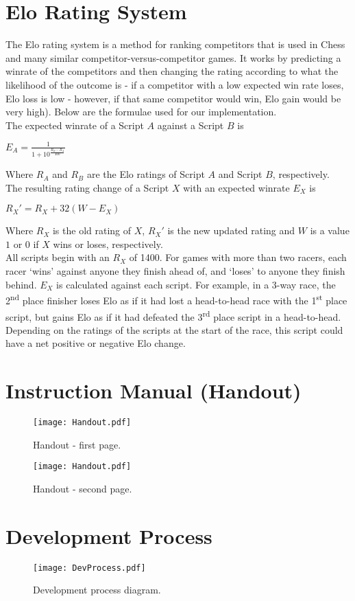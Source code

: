 \section{Elo Rating System}
The Elo rating system is a method for ranking competitors that is used in Chess and many similar competitor-versus-competitor games. It works by predicting a winrate of the competitors and then changing the rating according to what the likelihood of the outcome is - if a competitor with a low expected win rate loses, Elo loss is low - however, if that same competitor would win, Elo gain would be very high). Below are the formulae used for our implementation.\\

The expected winrate of a Script $A$ against a Script $B$ is \\

{\Large\centerline{$E_{A} = \frac{1}{1 + 10^\frac{R_{B}-R_{A}}{400}}$}}

Where $R_{A}$ and $R_{B}$ are the Elo ratings of Script $A$ and Script $B$, respectively.\\

The resulting rating change of a Script $X$ with an expected winrate $E_{X}$ is \\

{\Large\centerline{$R_{X}' = R_{X} + 32(W - E_{X})$}}

Where $R_{X}$ is the old rating of $X$, $R_{X}'$ is the new updated rating and $W$ is a value $1$ or $0$ if $X$ wins or loses, respectively.\\

All scripts begin with an $R_{X}$ of 1400.  For games with more than two racers, each racer `wins' against anyone they finish ahead of, and `loses' to anyone they finish behind. $E_{X}$ is calculated against each script. For example, in a 3-way race, the 2\textsuperscript{nd} place finisher loses Elo as if it had lost a head-to-head race with the 1\textsuperscript{st} place script, but gains Elo as if it had defeated the 3\textsuperscript{rd} place script in a head-to-head. Depending on the ratings of the scripts at the start of the race, this script could have a net positive or negative Elo change.
\section{Instruction Manual (Handout)}

\begin{figure}
\centering
\texttt{[image: Handout.pdf]}
\caption{Handout - first page.}
\end{figure}
\begin{figure}
\centering
\texttt{[image: Handout.pdf]}
\caption{Handout - second page.}
\end{figure}

\section{Development Process}

\begin{figure}
\centering
\texttt{[image: DevProcess.pdf]}
\caption{Development process diagram.}
\end{figure}